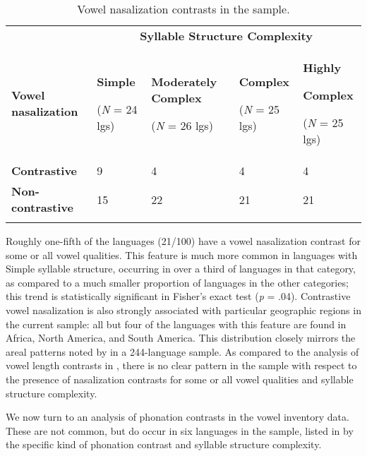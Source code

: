 \begin{table}
\begin{tabularx}{\textwidth}{XXXXX}
 & \multicolumn{4}{c}{ \textbf{Syllable Structure Complexity}}\\
\lsptoprule
\textbf{Vowel nasalization} & { \textbf{Simple}}

 (\textit{N} = 24 lgs) & { \textbf{Moderately Complex}}

 (\textit{N} = 26 lgs) & { \textbf{Complex}}

 (\textit{N} = 25 lgs) & { \textbf{Highly} }

{ \textbf{Complex}}

 (\textit{N} = 25 lgs)\\
\textbf{Contrastive} & 9 & 4 & 4 & 4\\
\textbf{Non-contrastive} & 15 & 22 & 21 & 21\\
\lspbottomrule
\end{tabularx}
\caption{\label{tab:4.4}Vowel nasalization contrasts in the sample.}
\end{table}

  Roughly one-fifth of the languages (21/100) have a vowel nasalization contrast for some or all vowel qualities. This feature is much more common in languages with Simple syllable structure, occurring in over a third of languages in that category, as compared to a much smaller proportion of languages in the other categories; this trend is statistically significant in Fisher’s exact test (\textit{p} = .04). Contrastive vowel nasalization is also strongly associated with particular geographic regions in the current sample: all but four of the languages with this feature are found in Africa, North America, and South America. This distribution closely mirrors the areal patterns noted by \citet{Hajek2013} in a 244-language sample. As compared to the analysis of vowel length contrasts in , there is no clear pattern in the sample with respect to the presence of nasalization contrasts for some or all vowel qualities and syllable structure complexity.

  We now turn to an analysis of phonation contrasts in the vowel inventory data. These are not common, but do occur in six languages in the sample, listed in  by the specific kind of phonation contrast and syllable structure complexity.

